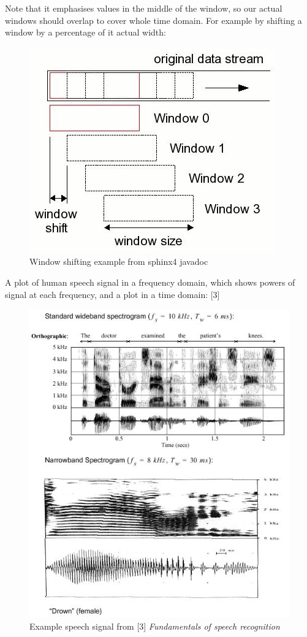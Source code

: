\documentclass[12pt,a4paper,english]{article}
\begin{document}
\newpage
Note that it emphasises values in the middle of the window, so our actual windows should overlap to cover whole time domain. For example by shifting a window by a percentage of it actual width:
\begin{figure}[hb]
    \centering
    \includegraphics[scale=0.3]{window_shifting.jpg}
    \caption[]{Window shifting example from sphinx4 javadoc}
\end{figure}

A plot of human speech signal in a frequency domain, which shows powers of signal at each frequency, and a plot in a time domain: [3]
\begin{figure}[hb]
    \centering
    \includegraphics[scale=0.5]{speech_spectrogram.jpg}
    \caption[]{Example speech signal from [3] \emph{Fundamentals of speech recognition}}
\end{figure}
\end{document}
